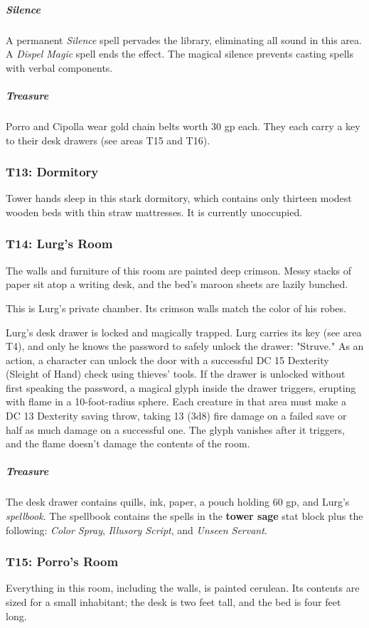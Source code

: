 \documentclass[10pt,a4paper,twoside,bg=print,twocolumn,openany,nodeprecatedcode]{dndbook}
\begin{document}
\subparagraph{Silence}
A permanent \textit{Silence} spell pervades the library, eliminating all sound in this area. A \textit{Dispel Magic} spell ends the effect. The magical silence prevents casting spells with verbal components.

\subparagraph{Treasure}
Porro and Cipolla wear gold chain belts worth 30 gp each. They each carry a key to their desk drawers (see areas T15 and T16).

\subsubsection{T13: Dormitory}
Tower hands sleep in this stark dormitory, which contains only thirteen modest wooden beds with thin straw mattresses. It is currently unoccupied.

\subsubsection{T14: Lurg's Room}
\begin{DndReadAloud}{}
The walls and furniture of this room are painted deep crimson. Messy stacks of paper sit atop a writing desk, and the bed's maroon sheets are lazily bunched.

\end{DndReadAloud}

This is Lurg's private chamber. Its crimson walls match the color of his robes.

Lurg's desk drawer is locked and magically trapped. Lurg carries its key (see area T4), and only he knows the password to safely unlock the drawer: "Struve." As an action, a character can unlock the door with a successful DC 15 Dexterity (Sleight of Hand) check using thieves' tools. If the drawer is unlocked without first speaking the password, a magical glyph inside the drawer triggers, erupting with flame in a 10-foot-radius sphere. Each creature in that area must make a DC 13 Dexterity saving throw, taking 13 (3d8) fire damage on a failed save or half as much damage on a successful one. The glyph vanishes after it triggers, and the flame doesn't damage the contents of the room.

\subparagraph{Treasure}
The desk drawer contains quills, ink, paper, a pouch holding 60 gp, and Lurg's \textit{spellbook}. The spellbook contains the spells in the \textbf{tower sage} stat block plus the following: \textit{Color Spray}, \textit{Illusory Script}, and \textit{Unseen Servant}.

\subsubsection{T15: Porro's Room}
\begin{DndReadAloud}{}
Everything in this room, including the walls, is painted cerulean. Its contents are sized for a small inhabitant; the desk is two feet tall, and the bed is four feet long.

\end{DndReadAloud}
\end{document}
